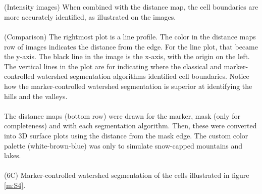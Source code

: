 \begin{centering}
{\\
\\
(Intensity images) When combined with the distance map, the cell boundaries are more accurately identified, as illustrated on the images.
\\
\\
(Comparison) The rightmost plot is a line profile. The color in the distance maps row of images indicates the distance from the edge. For the line plot, that became the y-axis. The black line in the image is the x-axis, with the origin on the left. The vertical lines in the plot are for indicating where the classical and marker-controlled watershed segmentation algorithms identified cell boundaries. Notice how the marker-controlled watershed segmentation is superior at identifying the hills and the valleys.
\\
\\
The distance maps (bottom row) were drawn for the marker, mask (only for completeness) and with each segmentation algorithm. Then, these were converted into 3D surface plots using the distance from the mask edge. The custom color palette (white-brown-blue) was only to simulate snow-capped mountains and lakes.
\\
\\
(6C) Marker-controlled watershed segmentation of the cells illustrated in figure \ref{m:S4}.}
\label{m:S5}
\end{centering}


